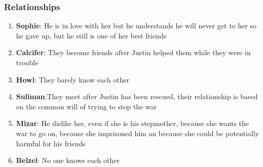 




\subsubsection*{Relationships}
\begin{enumerate}
\item \textbf{Sophie}: He is in love with her but he understands he will never get to her so he gave up, but he still is one of her best friends
\item \textbf{Calcifer}: They become friends after Justin helped them while they were in trouble
\item \textbf{Howl}: They barely know each other
\item \textbf{Suliman}:They meet after Justin has been rescued, their relationship is based on the common will of trying to stop the war
             
\item \textbf{Mizar}: He dislike her, even if she is his stepmother, because she wants the war to go on, because she imprisoned him an because she could be potentially harmful for his friends
\item \textbf{Belzel}: No one knows each other
\end{enumerate}

